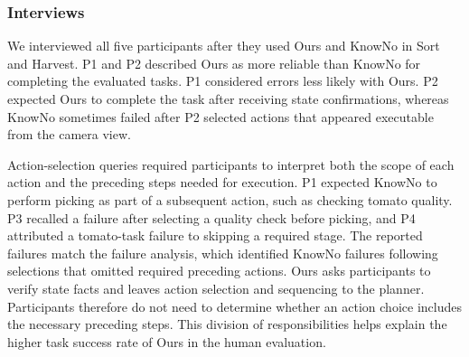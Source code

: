 \subsubsection{Interviews}\label{exp:interviews}
We interviewed all five participants after they used Ours and KnowNo in Sort and Harvest. P1 and P2 described Ours as more reliable than KnowNo for completing the evaluated tasks. P1 considered errors less likely with Ours. P2 expected Ours to complete the task after receiving state confirmations, whereas KnowNo sometimes failed after P2 selected actions that appeared executable from the camera view.

Action-selection queries required participants to interpret both the scope of each action and the preceding steps needed for execution. P1 expected KnowNo to perform picking as part of a subsequent action, such as checking tomato quality. P3 recalled a failure after selecting a quality check before picking, and P4 attributed a tomato-task failure to skipping a required stage. The reported failures match the failure analysis, which identified KnowNo failures following selections that omitted required preceding actions. Ours asks participants to verify state facts and leaves action selection and sequencing to the planner. Participants therefore do not need to determine whether an action choice includes the necessary preceding steps. This division of responsibilities helps explain the higher task success rate of Ours in the human evaluation.


